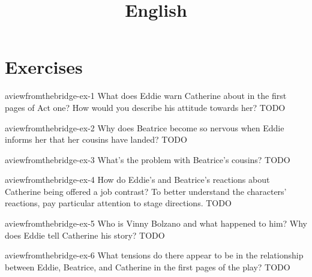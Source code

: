 \documentclass[preview]{standalone}
\begin{document}
\title{English}
\genpage

\section{Exercises}

\begin{snippetexercise}{aviewfromthebridge-ex-1}
{What does Eddie warn Catherine about in the first pages of Act one? How would you describe his
attitude towards her?}
TODO
\end{snippetexercise}

\begin{snippetexercise}{aviewfromthebridge-ex-2}
{Why does Beatrice become so nervous when Eddie informs her that her cousins have landed?}
TODO
\end{snippetexercise}

\begin{snippetexercise}{aviewfromthebridge-ex-3}
{What's the problem with Beatrice's cousins?}
TODO
\end{snippetexercise}

\begin{snippetexercise}{aviewfromthebridge-ex-4}
{How do Eddie's and Beatrice's reactions about Catherine being offered a job contrast? To better
understand the characters' reactions, pay particular attention to stage directions.}
TODO
\end{snippetexercise}

\begin{snippetexercise}{aviewfromthebridge-ex-5}
{Who is Vinny Bolzano and what happened to him? Why does Eddie tell Catherine his story?}
TODO
\end{snippetexercise}

\begin{snippetexercise}{aviewfromthebridge-ex-6}
{What tensions do there appear to be in the relationship between Eddie, Beatrice, and Catherine
in the first pages of the play?}
TODO
\end{snippetexercise}
\end{document}
